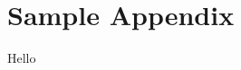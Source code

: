 \chapter{Sample Appendix}
\label{app:sample-appendix}

\lipsum[1]

Hello\cite{article-full}

\lipsum[1]

\clearpage
\newpage
